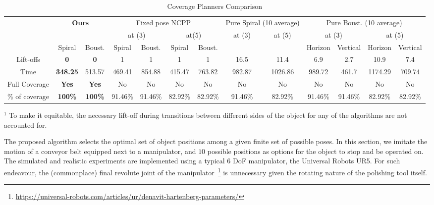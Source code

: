 \documentclass[letterpaper,journal]{IEEEtran}
\begin{document}
\begin{table}[t]
\centering
\caption{Coverage Planners Comparison}
\renewcommand{\arraystretch}{1.2}
\begin{tabular}{|c|c|c|c|c|c|c|c|c|c|c|c|c|}
\hline
& \multicolumn{2}{c|}{\textbf{Ours} } & \multicolumn{4}{c|}{Fixed pose NCPP~\cite{Yang2020Cellular}} & \multicolumn{2}{c|}{Pure Spiral (10 average)} & \multicolumn{4}{c|}{Pure Boust. (10 average)}\\
\cline{2-13}
& & & \multicolumn{2}{c|}{at (3)} & \multicolumn{2}{c|}{at(5)} & at (3) & at (5) & \multicolumn{2}{c|}{at (3)} & \multicolumn{2}{c|}{at (5)}\\
\cline{4-7}\cline{10-13}
&Spiral&Boust.& Spiral & Boust. & Spiral & Boust. &&& Horizon & Vertical & Horizon & Vertical\\
\hline
\hline
Lift-offs & \textbf{0} & \textbf{0} & 1 & 1 & 1 & 1 & 16.5 & 11.4 & 6.9 & 2.7 & 10.9 & 7.4\\
\hline
Time & \textbf{348.25} & 513.57 & 469.41 & 854.88 & 415.47 &763.82&982.87 & 1026.86 & 989.72& 461.7 & 1174.29 & 709.74\\
\hline
Full Coverage & \textbf{Yes} &\textbf{Yes} & No &No &No &No &No &No &No &No &No &No \\
\hline
\% of coverage & \textbf{100\%} & \textbf{100\%} & 91.46\% & 91.46\% & 82.92\% & 82.92\%& 91.46\% & 82.92\% & 91.46\% & 91.46\% & 82.92\% & 82.92\%\\
\hline
\end{tabular}
\label{table:comparative_results}
\begin{tablenotes}
\item $^1$ To make it equitable, the necessary lift-off during transitions between different sides of the object for any of the algorithms are not accounted for.
\end{tablenotes}
\vspace{-0.1cm}
\end{table}


The proposed algorithm selects the optimal set of object positions among a given finite set of possible poses. 
In this section, we imitate the motion of a conveyor belt equipped next to a manipulator, and $10$ possible positions as options for the object to stop and be operated on. 
The simulated and realistic experiments are implemented using a typical 6 DoF manipulator, 
the Universal Robots UR5. %
For such endeavour, the (commonplace) final revolute joint of the manipulator~\footnote{\url{https://universal-robots.com/articles/ur/denavit-hartenberg-parameters/}} 
is unnecessary given the rotating nature of the polishing tool itself. 
\end{document}
